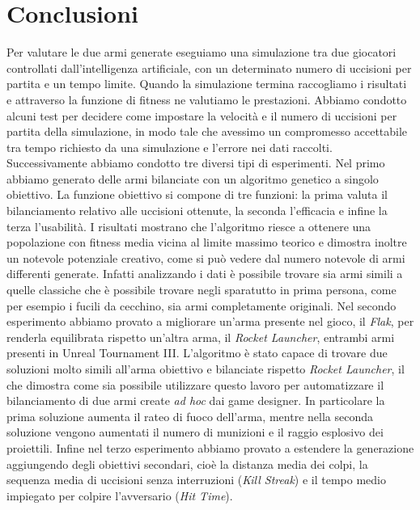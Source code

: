 \documentclass[12pt, italian]{toptesi}
\begin{document}
\section{Conclusioni}

Per valutare le due armi generate eseguiamo una simulazione tra due giocatori controllati dall'intelligenza artificiale, con un determinato numero di uccisioni per partita e un tempo limite. Quando la simulazione termina raccogliamo i risultati e attraverso la funzione di fitness ne valutiamo le prestazioni.
Abbiamo condotto alcuni test per decidere come impostare la velocità e il numero di uccisioni per partita della simulazione, in modo tale che avessimo un compromesso accettabile tra tempo richiesto da una simulazione e l'errore nei dati raccolti.
Successivamente abbiamo condotto tre diversi tipi di esperimenti.
Nel primo abbiamo generato delle armi bilanciate con un algoritmo genetico a singolo obiettivo. La funzione obiettivo si compone di tre funzioni: la prima valuta il bilanciamento relativo alle uccisioni ottenute, la seconda l'efficacia e infine la terza l'usabilità.
I risultati mostrano che l'algoritmo riesce a ottenere una popolazione con fitness media vicina al limite massimo teorico e dimostra inoltre un notevole potenziale creativo, come si può vedere dal numero notevole di armi differenti generate. Infatti analizzando i dati è possibile trovare sia armi simili a quelle classiche che è possibile trovare negli sparatutto in prima persona, come per esempio i fucili da cecchino, sia armi completamente originali.
Nel secondo esperimento abbiamo provato a migliorare un'arma presente nel gioco, il \emph{Flak}, per renderla equilibrata rispetto un'altra arma, il \emph{Rocket Launcher}, entrambi armi presenti in Unreal Tournament III.
L'algoritmo è stato capace di trovare due soluzioni molto simili all'arma obiettivo e bilanciate rispetto \emph{Rocket Launcher}, il che dimostra come sia possibile utilizzare questo lavoro per automatizzare il bilanciamento di due armi create \emph{ad hoc} dai game designer. In particolare la prima soluzione aumenta il rateo di fuoco dell'arma, mentre nella seconda soluzione vengono aumentati il numero di munizioni e il raggio esplosivo dei proiettili.
Infine nel terzo esperimento abbiamo provato a estendere la generazione aggiungendo degli obiettivi secondari, cioè la distanza media dei colpi, la sequenza media di uccisioni senza interruzioni (\emph{Kill Streak}) e il tempo medio impiegato per colpire l'avversario (\emph{Hit Time}).
\end{document}
